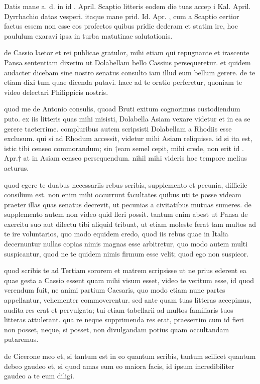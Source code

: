 


 Datis mane a. d. in id . April. Scaptio litteris eodem die tuas accep i Kal. April. Dyrrhachio datas vesperi. itaque mane prid. Id. Apr. , cum a Scaptio certior factus essem non esse eos profectos quibus pridie dederam et statim ire, hoc paululum exaravi ipsa in turba matutinae salutationis.

 de Cassio laetor et rei publicae gratulor, mihi etiam qui repugnante et irascente Pansa sententiam dixerim ut Dolabellam bello Cassius persequeretur. et quidem audacter dicebam sine nostro senatus consulto iam illud eum bellum gerere. de te etiam dixi tum quae dicenda putavi. haec ad te oratio perferetur, quoniam te video delectari Philippicis nostris.

 quod me de Antonio consulis, quoad Bruti exitum cognorimus custodiendum puto. ex iis litteris quas mihi misisti, Dolabella Asiam vexare videtur et in ea se gerere taeterrime. compluribus autem scripsisti Dolabellam a Rhodiis esse exclusum. qui si ad Rhodum accessit, videtur mihi Asiam reliquisse. id si ita est, istic tibi censeo commorandum; sin †eam semel cepit, mihi crede, non erit id . Apr.† at in Asiam censeo persequendum. nihil mihi videris hoc tempore melius acturus.

 quod egere te duabus necessariis rebus scribis, supplemento et pecunia, difficile consilium est. non enim mihi occurrunt facultates quibus uti te posse videam praeter illas quas senatus decrevit, ut pecunias a civitatibus mutuas sumeres. de supplemento autem non video quid fleri possit. tantum enim abest ut Pansa de exercitu suo aut dilectu tibi aliquid tribuat, ut etiam moleste ferat tam multos ad te ire voluntarios, quo modo equidem credo, quod iis rebus quae in Italia decernuntur nullas copias nimis magnas esse arbitretur, quo modo autem multi suspicantur, quod ne te quidem nimis firmum esse velit; quod ego non suspicor.

 quod scribis te ad Tertiam sororem et matrem scripsisse ut ne prius ederent ea quae gesta a Cassio essent quam mihi visum esset, video te veritum esse, id quod verendum fuit, ne animi partium Caesaris, quo modo etiam nunc partes appellantur, vehementer commoverentur. sed ante quam tuas litteras accepimus, audita res erat et pervulgata; tui etiam tabellarii ad multos familiaris tuos litteras attulerant. qua re neque supprimenda res erat, praesertim cum id fieri non posset, neque, si posset, non divulgandam potius quam occultandam putaremus.

 de Cicerone meo et, si tantum est in eo quantum scribis, tantum scilicet quantum debeo gaudeo et, si quod amas eum eo maiora facis, id ipsum incredibiliter gaudeo a te eum diligi.
